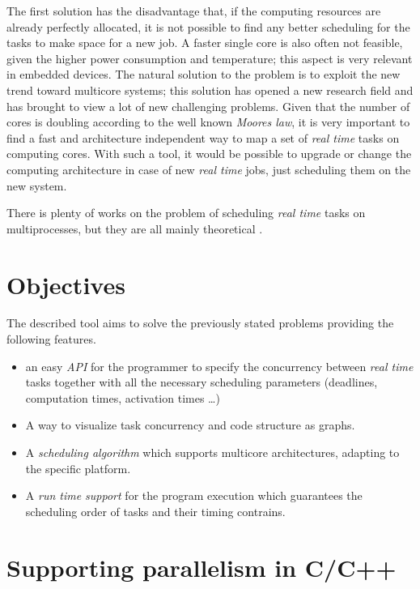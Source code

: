 \documentclass[a4paper,12pt,oneside]{book}
\begin{document}
The first solution has the disadvantage that, if the computing resources are already perfectly allocated, it is not possible to find any better scheduling for the tasks to make space for a new job. A faster single core is also often not feasible, given the higher power consumption and temperature; this aspect is very relevant in embedded devices. 
The natural solution to the problem is to exploit the new trend toward multicore systems; this solution has opened a new research field and has brought to view a lot of new challenging problems. Given that the number of cores is doubling according to the well known \emph{Moores law}, it is very important to find a fast and architecture independent way to map a set of \emph{real time} tasks on computing cores. With such a tool, it would be possible to upgrade or change the computing architecture in case of new \emph{real time} jobs, just scheduling them on the new system.

There is plenty of works on the problem of scheduling \emph{real time} tasks on multiprocesses, but they are all mainly theoretical \cite{bbw2}\cite{real1}\cite{real2}.



\section{Objectives}

The described tool aims to solve the previously stated problems providing the following features.

\begin{itemize}
\item{an easy \emph{API} for the programmer to specify the concurrency between \emph{real time} tasks together with all the necessary scheduling parameters (deadlines, computation times, activation times \dots)}
\item{A way to visualize task concurrency and code structure as graphs.}
\item{A \emph{scheduling algorithm} which supports multicore architectures, adapting to the specific platform.}
\item{A \emph{run time support} for the program execution which guarantees the scheduling order of tasks and their timing contrains.}
\end{itemize}


\section{Supporting parallelism in C/C++}
\end{document}
